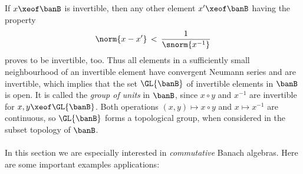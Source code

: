 \documentclass[11pt,twoside]{article}
\begin{document}
\subparagraph{}
If $x \xeof \banB$ is invertible,
then any other element $x' \xeof \banB$ having the property
\[
\norm{ x - x'} \, < \, \frac{1}{\snorm{x^{-1}}}
\]
proves to be invertible, too.
Thus all elements in a sufficiently small neighbourhood
of an invertible element have convergent Neumann series
and are invertible,
which implies that
the set $\GL{\banB} $ of invertible elements in $\banB$ is open.
It is called the \textit{group of units} in $\banB$,
since $x \circ y$ and $x^{-1}$ are invertible for $x,y \xeof \GL{\banB} $.
Both operations $(x,y) \mapsto x \circ y$
and $x \mapsto x^{-1}$ are continuous, 
so $\GL{\banB} $ forms a topological group,
when considered in the subset topology of $\banB$.

\paragraph{} %
In this section we are especially interested
in \textit{commutative} Banach algebras.
Here are some important examples {\wrt} applications:
\end{document}
